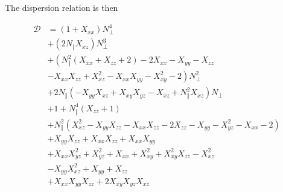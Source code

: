 \documentclass[a4paper,12pt]{article}%
\begin{document}
The dispersion relation is then%

\begin{align}
\mathcal{D}  &  =\left(  1+X_{xx}\right)  N_{\bot}^{4}\nonumber\\
&  +\left(  2N_{\Vert}X_{xz}\right)  N_{\bot}^{3}\nonumber\\
&  +\left(  N_{\Vert}^{2}\left(  X_{xx}+X_{zz}+2\right)  -2X_{xx}%
-X_{yy}-X_{zz}\right. \nonumber\\
&  \left.  -X_{xx}X_{zz}+X_{xz}^{2}-X_{xx}X_{yy}-X_{xy}^{2}-2\right)  N_{\bot
}^{2}\nonumber\\
&  +2N_{\Vert}\left(  -X_{yy}X_{xz}+X_{xy}X_{yz}-X_{xz}+N_{\Vert}^{2}%
X_{xz}\right)  N_{\bot}\nonumber\\
&  +1+N_{\Vert}^{4}\left(  X_{zz}+1\right) \nonumber\\
&  +N_{\Vert}^{2}\left(  X_{xz}^{2}-X_{yy}X_{zz}-X_{xx}X_{zz}-2X_{zz}%
-X_{yy}-X_{yz}^{2}-X_{xx}-2\right) \nonumber\\
&  +X_{yy}X_{zz}+X_{xx}X_{zz}+X_{xx}X_{yy}\nonumber\\
&  +X_{xx}X_{yz}^{2}+X_{yz}^{2}+X_{xx}+X_{xy}^{2}+X_{xy}^{2}X_{zz}-X_{xz}%
^{2}\nonumber\\
&  -X_{yy}X_{xz}^{2}+X_{yy}+X_{zz}\nonumber\\
&  +X_{xx}X_{yy}X_{zz}+2X_{xy}X_{yz}X_{xz} \label{D}%
\end{align}
\end{document}
